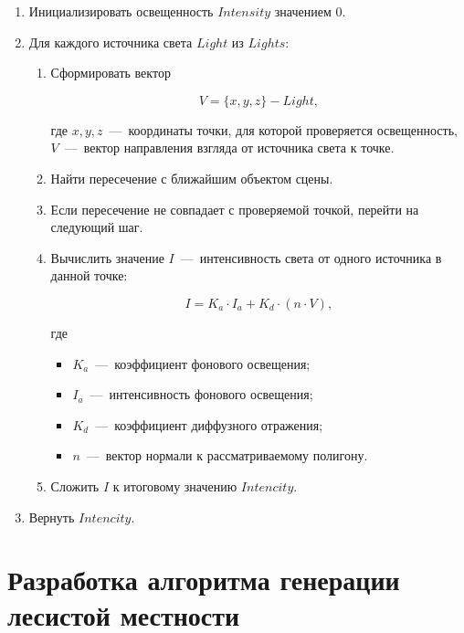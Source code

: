 \begin{enumerate}	
	\item Инициализировать освещенность $Intensity$ значением $0$.

	\item Для каждого источника света $Light$ из $Lights$:
	
	\begin{enumerate}
		\item Сформировать вектор
		
		\begin{equation}
			V = \{x, y, z\} - Light,
		\end{equation}
		
		где $x, y, z$~---~координаты точки, для которой проверяется освещенность, $V$~---~вектор направления взгляда от источника света к точке.
		
		\item Найти пересечение с ближайшим объектом сцены.
		\item Если пересечение не совпадает с проверяемой точкой, перейти на следующий шаг.
		\item Вычислить значение $I$~---~интенсивность света от одного источника в данной точке:
		
		\begin{equation}
			I = K_a \cdot I_a + K_d \cdot (n \cdot V),
		\end{equation}
		
		где 
		
		\begin{itemize}
			\item $K_a$~---~коэффициент фонового освещения;
			\item $I_a$~---~интенсивность фонового освещения;
			\item $K_d$~---~коэффициент диффузного отражения;
			\item $n$~---~вектор нормали к рассматриваемому полигону.
		\end{itemize}
		
		\item Сложить $I$ к итоговому значению $Intencity$.
	\end{enumerate}
	
	\item Вернуть $Intencity$.
\end{enumerate}

\section{Разработка алгоритма генерации лесистой местности}
